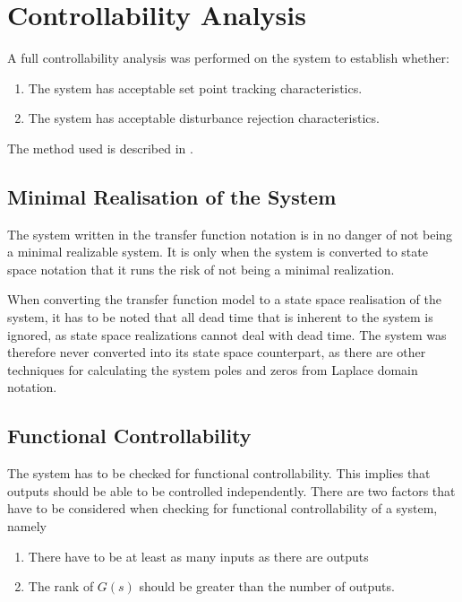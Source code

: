 \section{Controllability Analysis}

A full controllability analysis was performed on the system to establish whether:

\begin{enumerate}
	\item The system has acceptable set point tracking characteristics.
	\item The system has acceptable disturbance rejection characteristics.
\end{enumerate}

The method used is described in \textcite{skogestad}. 

\subsection{Minimal Realisation of the System}

The system written in the transfer function notation is in no danger of not being a minimal realizable system. It is only when the system is converted to state space notation that it runs the risk of not being a minimal realization. 

When converting the transfer function model to a state space realisation of the system, it has to be noted that all dead time that is inherent to the system is ignored, as state space realizations cannot deal with dead time. The system was therefore never converted into its state space counterpart, as there are other techniques for calculating the system poles and zeros from Laplace domain notation.

\subsection{Functional Controllability}

The system has to be checked for functional controllability. This implies that outputs should be able to be controlled independently. There are two factors that have to be considered when checking for functional controllability of a system, namely

\begin{enumerate}
	\item There have to be at least as many inputs as there are outputs
	\item The rank of $G(s)$ should be greater than the number of outputs.
\end{enumerate} 

